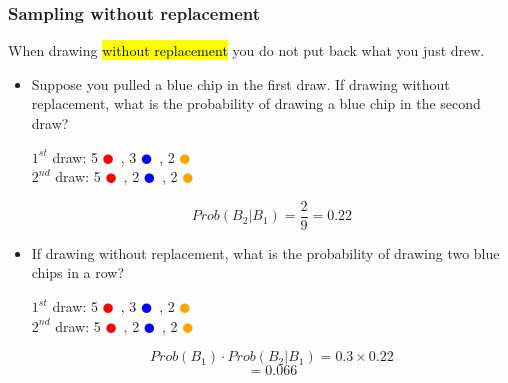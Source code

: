 \documentclass[slidestop,compress,mathserif]{beamer}
\begin{document}

\begin{frame}
\frametitle{Sampling without replacement}

When drawing \hl{without replacement} you do not put back what you just drew.

\begin{itemize}

\pause

\item Suppose you pulled a blue chip in the first draw. If drawing without replacement, what is the probability of drawing a blue chip in the second draw?
\pause
\begin{center}
$1^{st}$ draw: 5 \textcolor{red}{$\CIRCLE$}~, 3 \textcolor{blue}{$\CIRCLE$}~, 2 \textcolor{orange}{$\CIRCLE$} \\
\pause
$2^{nd}$ draw: 5 \textcolor{red}{$\CIRCLE$}~, 2 \textcolor{blue}{$\CIRCLE$}~, 2 \textcolor{orange}{$\CIRCLE$}
\end{center}
\pause
\[ Prob(B_2 | B_1) = \frac{2}{9} = 0.22 \]

\pause

\item If drawing without replacement, what is the probability of drawing two blue chips in a row?
\begin{center}

\pause
$1^{st}$ draw: 5 \textcolor{red}{$\CIRCLE$}~, 3 \textcolor{blue}{$\CIRCLE$}~, 2 \textcolor{orange}{$\CIRCLE$} \\
$2^{nd}$ draw: 5 \textcolor{red}{$\CIRCLE$}~, 2 \textcolor{blue}{$\CIRCLE$}~, 2 \textcolor{orange}{$\CIRCLE$}
\end{center}
\pause
\[ Prob(B_1) \cdot Prob(B_2 | B_1)  = 0.3 \times 0.22 \]
\[ = 0.066 \]

\end{itemize}

\end{frame}

\end{document}
